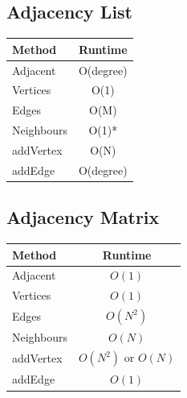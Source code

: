 \documentclass{article}
\begin{document}
\subsection{Adjacency List}
\begin{table}[!ht]
\centering
\begin{tabular}{|l|c|}
\hline
\textbf{Method} & \textbf{Runtime} \\
\hline
Adjacent & O(degree) \\
\hline
Vertices & O(1) \\
\hline
Edges & O(M) \\
\hline
Neighbours & O(1)* \\
\hline
addVertex & O(N) \\
\hline
addEdge & O(degree) \\
\hline
\end{tabular}
\end{table}

\newpage

\subsection{Adjacency Matrix}
\begin{table}[!ht]
\centering
\begin{tabular}{|l|c|}
\hline
\textbf{Method} & \textbf{Runtime} \\
\hline
Adjacent & $O(1)$ \\
\hline
Vertices & $O(1)$ \\
\hline
Edges & $O(N^2)$ \\
\hline
Neighbours & $O(N)$ \\
\hline 
addVertex & $O(N^2)$ or $O(N)$ \\
\hline
addEdge & $O(1)$ \\
\hline
\end{tabular}
\end{table}
\end{document}
